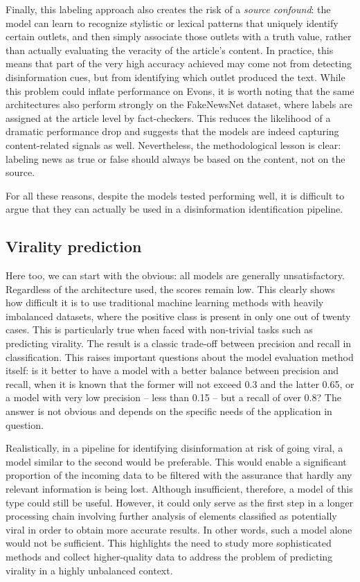 \documentclass[a4paper,twoside,12pt]{book}
\begin{document}
Finally, this labeling approach also creates the risk of a \emph{source confound}: the model can learn to recognize stylistic or lexical patterns that uniquely identify certain outlets, and then simply associate those outlets with a truth value, rather than actually evaluating the veracity of the article’s content. In practice, this means that part of the very high accuracy achieved may come not from detecting disinformation cues, but from identifying which outlet produced the text. While this problem could inflate performance on Evons, it is worth noting that the same architectures also perform strongly on the FakeNewsNet dataset, where labels are assigned at the article level by fact-checkers. This reduces the likelihood of a dramatic performance drop and suggests that the models are indeed capturing content-related signals as well. Nevertheless, the methodological lesson is clear: labeling news as true or false should always be based on the content, not on the source.

For all these reasons, despite the models tested performing well, it is difficult to argue that they can actually be used in a disinformation identification pipeline.

\subsection{Virality prediction}
Here too, we can start with the obvious: all models are generally unsatisfactory. Regardless of the architecture used, the scores remain low. This clearly shows how difficult it is to use traditional machine learning methods with heavily imbalanced datasets, where the positive class is present in only one out of twenty cases. This is particularly true when faced with non-trivial tasks such as predicting virality. The result is a classic trade-off between precision and recall in classification. This raises important questions about the model evaluation method itself: is it better to have a model with a better balance between precision and recall, when it is known that the former will not exceed 0.3 and the latter 0.65, or a model with very low precision -- less than 0.15 -- but a recall of over 0.8? The answer is not obvious and depends on the specific needs of the application in question.

Realistically, in a pipeline for identifying disinformation at risk of going viral, a model similar to the second would be preferable. This would enable a significant proportion of the incoming data to be filtered with the assurance that hardly any relevant information is being lost. Although insufficient, therefore, a model of this type could still be useful. However, it could only serve as the first step in a longer processing chain involving further analysis of elements classified as potentially viral in order to obtain more accurate results. In other words, such a model alone would not be sufficient. This highlights the need to study more sophisticated methods and collect higher-quality data to address the problem of predicting virality in a highly unbalanced context.
\end{document}
